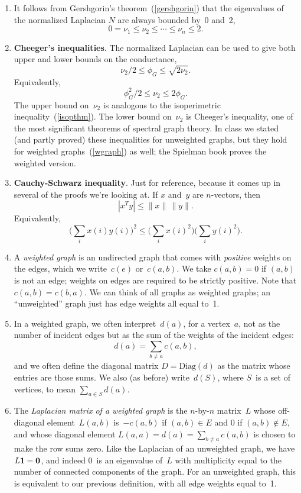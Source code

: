 \documentclass[11pt]{article}
\newcommand{\m}[1]{{\bf{#1}}}       %
\newcommand{\ones}{\m1}             %
\newcommand{\zeros}{\m0}            %
\newcommand{\Diag}{\mbox{Diag}}
\begin{document}
\begin{enumerate}
\item
It follows from Gershgorin's theorem~(\ref{gershgorin}) that
the eigenvalues of the normalized Laplacian $N$ are always bounded by~0 and~2,
$$0 = \nu_1 \leq \nu_2 \leq \cdots \leq \nu_n \leq 2.$$

\item\label{cheeger} {\bf Cheeger's inequalities}.
The normalized Laplacian can be used to give both 
upper and lower bounds on the conductance,
$$\nu_2/2 \leq \phi_G \leq \sqrt{2\nu_2}.$$
Equivalently,
$$\phi_G^2/2 \leq \nu_2 \leq 2\phi_G.$$
The upper bound on~$\nu_2$ is analogous to the
isoperimetric inequality~(\ref{isopthm}).
The lower bound on~$\nu_2$ is Cheeger's inequality,
one of the most significant theorems of spectral
graph theory.
In class we stated (and partly proved) these
inequalities for unweighted graphs, but they 
hold for weighted graphs~(\ref{wgraph}) as well; 
the Spielman book proves the weighted version.

\item\label{csi} {\bf Cauchy-Schwarz inequality}.
Just for reference, because it comes up in several of
the proofs we're looking at.  
If $x$ and~$y$ are $n$-vectors, then 
$$|x^Ty| \leq \|x\|\,\|y\|.$$
Equivalently,
$$\Big(\sum_i x(i)y(i)\Big)^2 \leq 
\Big(\sum_i x(i)^2\Big)
\Big(\sum_i y(i)^2\Big).$$

\item\label{wgraph}
A {\em weighted graph} is an undirected graph that comes 
with {\em positive} weights on the edges, which we write~$c(e)$ or~$c(a,b)$.
We take $c(a,b)=0$ if $(a,b)$ is not an edge; 
weights on edges are required to be strictly positive.
Note that $c(a,b)=c(b,a)$.
We can think of all graphs as weighted graphs;
an ``unweighted'' graph just has edge weights all equal to~1.

\item
In a weighted graph, we often interpret~$d(a)$, for a vertex~$a$,
not as the number of incident edges but as the sum of the weights
of the incident edges:
$$d(a) = \sum_{b \neq a}c(a,b),$$
and we often define the diagonal matrix $D = \Diag(d)$ as the matrix
whose entries are those sums.
We also (as before) write~$d(S)$, where $S$~is a set of vertices, 
to mean $\sum_{a \in S}d(a)$.

\item\label{wlap}
The {\em Laplacian matrix of a weighted graph}
is the $n$-by-$n$ matrix~$L$ whose off-diagonal
element~$L(a,b)$ is~$-c(a,b)$ if $(a,b) \in E$ and $0$ if $(a,b) \notin E$,
and whose diagonal element $L(a,a) = d(a) = \sum_{b \neq a}c(a,b)$ is chosen to
make the row sums zero.
Like the Laplacian of an unweighted graph, we have $L\ones=\zeros$, 
and indeed 0~is an eigenvalue of~$L$ with multiplicity equal to the 
number of connected components of the graph.
For an unweighted graph, this is equivalent to our previous definition,
with all edge weights equal to~1.


\end{enumerate}
\end{document}
